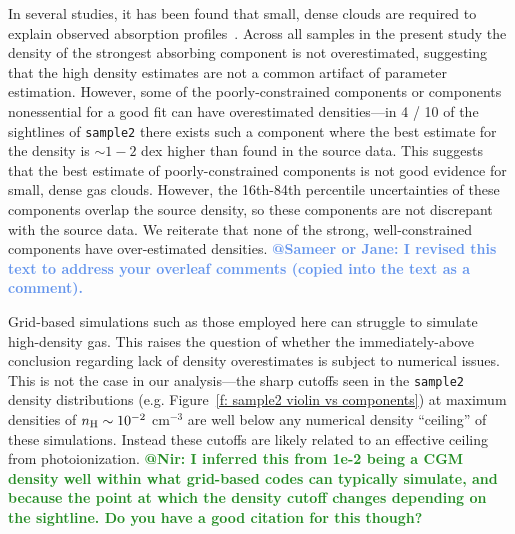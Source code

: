 \documentclass[fleqn,usenatbib]{mnras}
\makeatletter
\newcommand{\atsameer}[1]{\textcolor{CornflowerBlue}{\textbf{@Sameer or Jane: #1}}}
\newcommand{\atnir}[1]{\textcolor{ForestGreen}{\textbf{@Nir: #1}}}
\makeatother
\begin{document}
In several studies, it has been found that small, dense clouds are required to explain observed absorption profiles~\citep{Rigby2002, Narayanan2008, Muzahid2018}.
Across all samples in the present study the density of the strongest absorbing component is not overestimated,
suggesting that the high density estimates are not a common artifact of parameter estimation.
However, some of the poorly-constrained components or components nonessential for a good fit can have overestimated densities---in 4 / 10 of the sightlines of \texttt{sample2} there exists such a component where the best estimate for the density is $\sim 1-2$ dex higher than found in the source data.
This suggests that the best estimate of poorly-constrained components is not good evidence for small, dense gas clouds.
However, the 16th-84th percentile uncertainties of these components overlap the source density,
so these components are not discrepant with the source data.
We reiterate that none of the strong, well-constrained components have over-estimated densities.
\atsameer{I revised this text to address your overleaf comments (copied into the text as a comment).}

Grid-based simulations such as those employed here can struggle to simulate high-density gas.
This raises the question of whether the immediately-above conclusion regarding lack of density overestimates is subject to numerical issues.
This is not the case in our analysis---the sharp cutoffs seen in the \texttt{sample2} density distributions (e.g. Figure~\ref{f: sample2 violin vs components})  at maximum densities of $n_{\rm H} \sim 10^{-2}$ cm$^{-3}$ are well below any numerical density ``ceiling'' of these simulations.
Instead these cutoffs are likely related to an effective ceiling from photoionization.
\atnir{I inferred this from 1e-2 being a CGM density well within what grid-based codes can typically simulate, and because the point at which the density cutoff changes depending on the sightline. Do you have a good citation for this though?}
\end{document}
